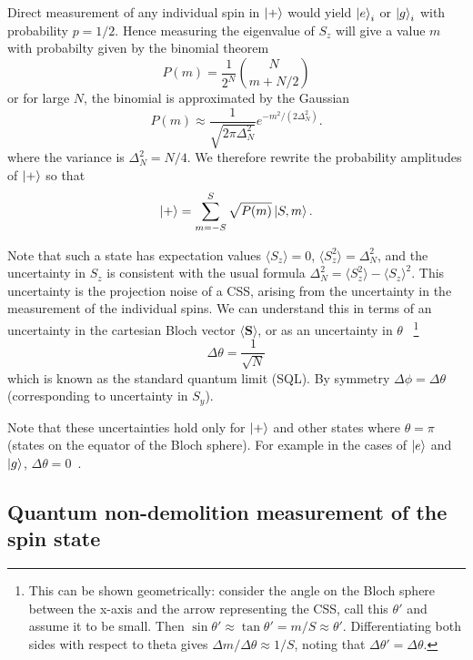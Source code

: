 Direct measurement of any individual spin in $\ket{+}$ would yield $\ket{e}_i$
or $\ket{g}_i$ with probability $p=1/2$. Hence measuring the eigenvalue of
$S_z$ will give a value $m$ with probabilty given by the binomial
theorem~\cite{Gazeau2009}
%
\begin{equation}
  P(m) = \frac{1}{2^N} \binom{N}{m+N/2}
\end{equation}
%
or for large $N$, the binomial is approximated by the Gaussian
%
\begin{equation}
  P(m) \approx\frac{1}{\sqrt{2\pi \Delta_N^2}} e^{-m^2/(2\Delta_N^2)}.
  \label{eqn:CSSmprob}
\end{equation}
%
where the variance is $\Delta_N^2 = N/4$. We therefore rewrite the probability
amplitudes of $\ket{+}$ so that
%
\begin{equation}
  \ket{+} = \sum_{m=-S}^S \sqrt{P(m)}\ket{S,m}.
  \label{squeeze:eqn:plusdicke}
\end{equation}

Note that such a state has expectation values $\langle S_z \rangle = 0$,
$\langle S_z^2\rangle = \Delta_N^2$, and the uncertainty in $S_z$ is consistent
with the usual formula $\Delta_N^2 = \langle S_z^2 \rangle - \langle
S_z\rangle^2$. This uncertainty is the projection noise of a CSS, arising from
the uncertainty in the measurement of the individual spins. We can understand
this in terms of an uncertainty in the cartesian Bloch vector $\langle
\mathbf{S} \rangle$, or as an uncertainty in $\theta$~\cite{PhysRevA.47.3554}
%
\footnote{This can be shown geometrically: consider the angle on the Bloch
sphere between the x-axis and the arrow representing the CSS, call this
$\theta'$ and assume it to be small. Then $\sin
\theta' \approx \tan \theta' = m/S \approx \theta'$. Differentiating both sides
with respect to theta gives $\Delta m / \Delta \theta \approx 1/S$, noting that
$\Delta \theta' = \Delta \theta$.
}
%
\begin{equation}
  \Delta\theta = \frac{1}{\sqrt{N}}
\end{equation}
which is known as the standard quantum limit (SQL). By symmetry $\Delta \phi =
\Delta \theta$ (corresponding to uncertainty in $S_y$).

Note that these uncertainties hold only for $\ket{+}$ and other states where
$\theta = \pi$ (states on the equator of the Bloch sphere). For example in the
cases of $\ket{e}$ and $\ket{g}$, $\Delta \theta = 0$~\cite{PhysRevA.47.3554}.

\subsection{Quantum non-demolition measurement of the spin state}

